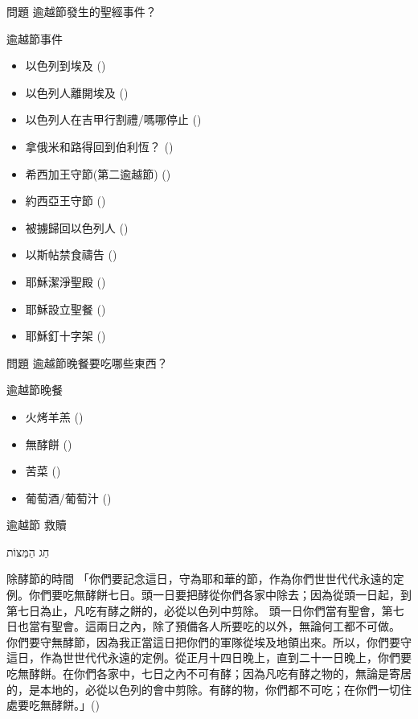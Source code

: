 \documentclass{beamer}
\newcommand{\topic}[1]{
\begin{frame}
    \centering
    \vspace*{1cm}
    {\fontsize{40}{48}\selectfont #1\par}
    \vfill
\end{frame}
}
\newcommand{\question}[1]{
\begin{frame}{問題}
    \centering
    \vspace*{1cm}
    \huge #1？\par
    \vfill
\end{frame}
}
\newcommand{\conclusion}[2]{
\begin{frame}
    \centering
    \vspace*{1cm}
    {\fontsize{40}{48}\selectfont #1 \textemdash #2\par}
    \vfill
\end{frame}
}
\newcommand{\parvspace}{\par\vspace{0.5em}}
\begin{document}
\question{逾越節發生的聖經事件}

\begin{frame}{逾越節事件}
    \begin{itemize}
        \item 以色列到埃及 ()
        \item 以色列人離開埃及 ()
        \item 以色列人在吉甲行割禮/嗎哪停止 ()
        \item 拿俄米和路得回到伯利恆？ ()
        \item 希西加王守節(第二逾越節) ()
        \item 約西亞王守節 ()
        \item 被擄歸回以色列人 ()
        \item 以斯帖禁食禱告 ()
        \item 耶穌潔淨聖殿 ()
        \item 耶穌設立聖餐 ()
        \item 耶穌釘十字架 ()
    \end{itemize}
\end{frame}

\question{逾越節晚餐要吃哪些東西}

\begin{frame}{逾越節晚餐}
    \begin{itemize}
        \item 火烤羊羔 ()
        \item 無酵餅 ()
        \item 苦菜 ()
        \item 葡萄酒/葡萄汁 ()
    \end{itemize}
\end{frame}

\conclusion{逾越節}{救贖}

\topic{\texthebrew{חַג הַמַּצּוֹת}}

\begin{frame}{除酵節的時間}
    「你們要記念這日，守為耶和華的節，作為你們世世代代永遠的定例。\alert{你們要吃無酵餅七日。頭一日要把酵從你們各家中除去}；因為從頭一日起，到第七日為止，凡吃有酵之餅的，必從以色列中剪除。 \alert{頭一日你們當有聖會，第七日也當有聖會}。這兩日之內，除了預備各人所要吃的以外，無論何工都不可做。 \alert{你們要守無酵節，因為我正當這日把你們的軍隊從埃及地領出來}。所以，你們要守這日，作為世世代代永遠的定例。從\alert{正月十四日晚上，直到二十一日晚上}，你們要吃無酵餅。在你們各家中，七日之內不可有酵；因為凡吃有酵之物的，無論是寄居的，是本地的，必從以色列的會中剪除。有酵的物，你們都不可吃；在你們一切住處要吃無酵餅。」()\parvspace
\end{frame}
\end{document}
